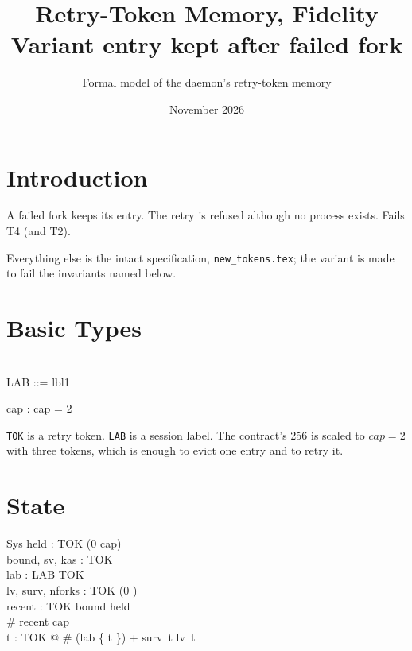 \documentclass[a4paper,10pt,fleqn]{article}
\begin{document}
\title{Retry-Token Memory, Fidelity Variant entry kept after failed fork}
\author{Formal model of the daemon's retry-token memory}
\date{November 2026}
\maketitle

\section{Introduction}

A failed fork keeps its entry. The retry is refused although no process exists. Fails T4 (and T2).

Everything else is the intact specification, \texttt{new\_tokens.tex}; the variant is made to fail the invariants named below.

\section{Basic Types}

\begin{zed}
  [TOK] \\
  LAB ::= lbl1
\end{zed}

\begin{axdef}
  cap : \nat
\where
  cap = 2
\end{axdef}

\texttt{TOK} is a retry token.  \texttt{LAB} is a session label.  The
contract's 256 is scaled to $cap = 2$ with three tokens, which is enough to
evict one entry and to retry it.

\section{State}

\begin{schema}{Sys}
  held : TOK \pfun (0 \upto cap) \\
  bound, sv, kas : \power TOK \\
  lab : LAB \pfun TOK \\
  lv, surv, nforks : TOK \fun (0 ) \\
  recent : \seq TOK
\where
  bound \subseteq \dom held \\
  \# recent \leq cap \\
  \forall t : TOK @ \# (lab \rres \{ t \}) + surv~t \leq lv~t
\end{schema}
\end{document}
